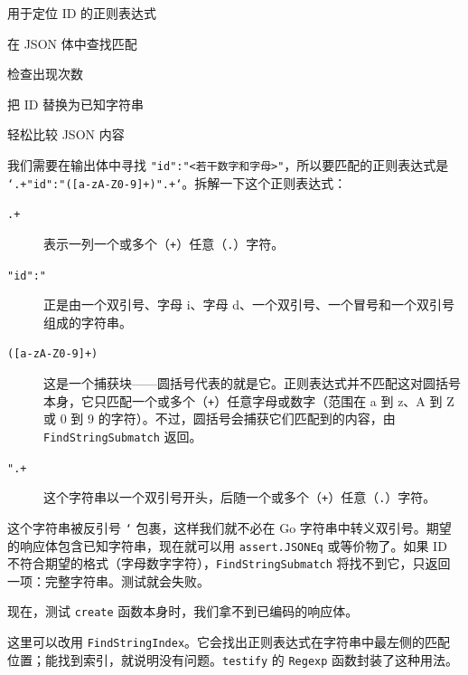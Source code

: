\begin{codeannotations}
\item 用于定位 ID 的正则表达式
\item 在 JSON 体中查找匹配
\item 检查出现次数
\item 把 ID 替换为已知字符串
\item 轻松比较 JSON 内容
\end{codeannotations}

我们需要在输出体中寻找 \texttt{"id":"<若干数字和字母>"}，所以要匹配的正则表达式是 \texttt{`.+"id":"([a-zA-Z0-9]+)".+`}。拆解一下这个正则表达式：

\begin{description}
  \item[\texttt{.+}] 表示一列一个或多个（\texttt{+}）任意（\texttt{.}）字符。
  \item[\texttt{"id":"}] 正是由一个双引号、字母 i、字母 d、一个双引号、一个冒号和一个双引号组成的字符串。
  \item[\texttt{([a-zA-Z0-9]+)}] 这是一个捕获块——圆括号代表的就是它。正则表达式并不匹配这对圆括号本身，它只匹配一个或多个（\texttt{+}）任意字母或数字（范围在 a 到 z、A 到 Z 或 0 到 9 的字符）。不过，圆括号会捕获它们匹配到的内容，由 \texttt{FindStringSubmatch} 返回。
  \item[\texttt{".+}] 这个字符串以一个双引号开头，后随一个或多个（\texttt{+}）任意（\texttt{.}）字符。
\end{description}

这个字符串被反引号 \texttt{`} 包裹，这样我们就不必在 Go 字符串中转义双引号。期望的响应体包含已知字符串，现在就可以用 \texttt{assert.JSONEq} 或等价物了。如果 ID 不符合期望的格式（字母数字字符），\texttt{FindStringSubmatch} 将找不到它，只返回一项：完整字符串。测试就会失败。

现在，测试 \texttt{create} 函数本身时，我们拿不到已编码的响应体。

这里可以改用 \texttt{FindStringIndex}。它会找出正则表达式在字符串中最左侧的匹配位置；能找到索引，就说明没有问题。\texttt{testify} 的 \texttt{Regexp} 函数封装了这种用法。


